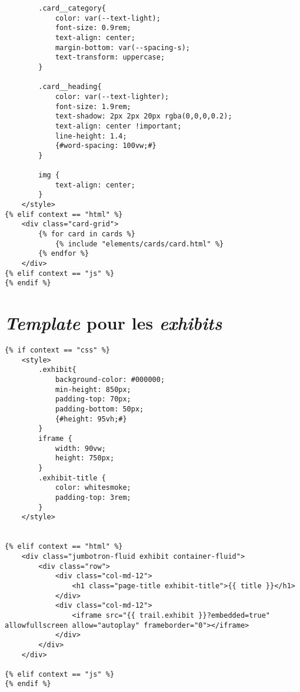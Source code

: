 \documentclass{article}
\begin{document}
\begin{verbatim}
        .card__category{
            color: var(--text-light);
            font-size: 0.9rem;
            text-align: center;
            margin-bottom: var(--spacing-s);
            text-transform: uppercase;
        }

        .card__heading{
            color: var(--text-lighter);
            font-size: 1.9rem;
            text-shadow: 2px 2px 20px rgba(0,0,0,0.2);
            text-align: center !important;
            line-height: 1.4;
            {#word-spacing: 100vw;#}
        }

        img {
            text-align: center;
        }
    </style>
{% elif context == "html" %}
    <div class="card-grid">
        {% for card in cards %}
            {% include "elements/cards/card.html" %}
        {% endfor %}
    </div>
{% elif context == "js" %}
{% endif %}
\end{verbatim}

\section{\textit{Template} pour les \textit{exhibits}}
\begin{verbatim}
{% if context == "css" %}
    <style>
        .exhibit{
            background-color: #000000;
            min-height: 850px;
            padding-top: 70px;
            padding-bottom: 50px;
            {#height: 95vh;#}
        }
        iframe {
            width: 90vw;
            height: 750px;
        }
        .exhibit-title {
            color: whitesmoke;
            padding-top: 3rem;
        }
    </style>


{% elif context == "html" %}
    <div class="jumbotron-fluid exhibit container-fluid">
        <div class="row">
            <div class="col-md-12">
                <h1 class="page-title exhibit-title">{{ title }}</h1>
            </div>
            <div class="col-md-12">
                <iframe src="{{ trail.exhibit }}?embedded=true" allowfullscreen allow="autoplay" frameborder="0"></iframe>
            </div>
        </div>
    </div>

{% elif context == "js" %}
{% endif %}

\end{verbatim}
\end{document}
